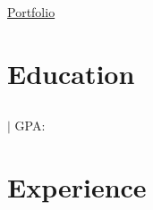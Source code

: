 \documentclass[10pt, a4paper]{article}
\newcommand{\subtext}[1]{
#1\par\vspace{-0.2cm}}
\newcommand{\hskills}[1]{{\bfseries #1} }
\begin{document}

\begin{center}
    \begin{minipage}[b]{0.3\textwidth}
            \small  \par
            \small \href{mailto:}{} 
    \end{minipage}%
    \begin{minipage}[b]{0.4\textwidth}
            \centering
            {\Huge \textbf{}}
    \end{minipage}%
    \begin{minipage}[b]{0.3\textwidth}
            \flushright \small
            \href{}{}\par
            \href{}{}\par
            \href{}{Portfolio}\par
    \end{minipage}   
    
\vspace{-0.15cm} 
{\color{UI_blue} \hrulefill}
\end{center}
\vspace{-0.25cm}


\hskills{} 
\vspace{-0.2cm}



\section{Education}

\subsection*{ \hfill }
\subtext{\textit{} $|$ GPA:  \hfill \normalfont }
\vspace{0.1cm}




\section{Experience}
\end{document}
